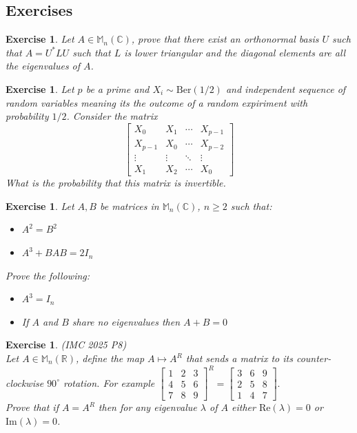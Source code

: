 \documentclass[12pt]{article}
\theoremstyle{definition}
\theoremstyle{remark}
\theoremstyle{plain}
\newtheorem{ex}[subsubsection]{Exercise}
\begin{document}
\subsection{Exercises}
\begin{ex}
Let $A\in \mathbb{M}_n(\mathbb{C})$, prove that there exist an orthonormal basis $U$ such that $A=U^*LU$ such that $L$ is lower triangular and the diagonal elements are all the eigenvalues of $A$.
\end{ex}
\begin{ex}
	Let $p$ be a prime and $X_i\sim \mathrm{Ber}(1/2)$ and independent sequence of random variables meaning its the outcome of a random expiriment with probability $1/2$. Consider the matrix $$
	\begin{bmatrix}
	X_0 & X_1 & \cdots & X_{p-1}\\ 
	X_{p-1} & X_0 & \cdots & X_{p-2}\\ 
	\vdots & \vdots & \ddots & \vdots \\ 
	X_1 & X_2 & \cdots & X_0

	\end{bmatrix}
	$$
What is the probability that this matrix is invertible.

\end{ex}

\begin{ex}

    Let $A,B$ be matrices in $\mathbb{M}_n(\mathbb{C})$, $n\geq2$ such that:
    \begin{itemize}
        \item $A^2=B^2$
        \item $A^3+BAB=2I_n$
    \end{itemize}
    Prove the following:
    \begin{itemize}
        \item $A^3=I_n$
        \item If $A$ and $B$ share no eigenvalues then $A+B=0$
    \end{itemize}
\end{ex}
\begin{ex}\textup{(IMC 2025 P8)}\\
    Let $A\in \mathbb{M}_n(\mathbb{R})$, define the map $A\mapsto A^R$ that sends a matrix to its counter-clockwise $90^\circ$ rotation. For example $\begin{bmatrix}
1 & 2 & 3 \\
4 & 5 & 6 \\
7 & 8 & 9
\end{bmatrix}^{R}
=
\begin{bmatrix}
3 & 6 & 9 \\
2 & 5 & 8 \\
1 & 4 & 7
\end{bmatrix}.$\\
Prove that if $A=A^R$ then for any eigenvalue $\lambda$ of $A$ either $\mathrm{Re}(\lambda)=0$ or $\mathrm{Im}(\lambda)=0$. 
\end{ex}
\newpage
\end{document}
